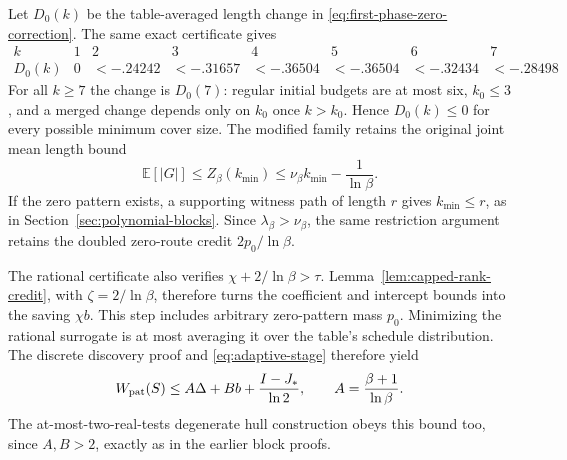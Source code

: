 Let $D_0(k)$ be the table-averaged length change in
\eqref{eq:first-phase-zero-correction}. The same exact certificate gives
\[
 \begin{array}{c|rrrrrrr}
 k&1&2&3&4&5&6&7\\\hline
 D_0(k)&0&<-.24242&<-.31657&<-.36504&<-.36504&<-.32434&<-.28498
 \end{array}
\]
For all $k\ge7$ the change is $D_0(7)$: regular initial budgets are
at most six, $k_0\le3$, and a merged change depends only on $k_0$
once $k>k_0$. Hence $D_0(k)\le0$ for every possible minimum cover
size. The modified family retains the original joint mean length bound
\[
 \mathbb E[|G|]\le Z_\beta(k_{\min})
 \le\nu_\beta k_{\min}-\frac1{\ln\beta}.
\]
If the zero pattern exists, a supporting witness path of length $r$
gives $k_{\min}\le r$, as in Section~\ref{sec:polynomial-blocks}.
Since $\lambda_\beta>\nu_\beta$, the same restriction argument
retains the doubled zero-route credit $2p_0/\ln\beta$.

The rational certificate also verifies $\chi+2/\ln\beta>\tau$.
Lemma~\ref{lem:capped-rank-credit}, with $\zeta=2/\ln\beta$,
therefore turns the coefficient and intercept bounds into the saving
$\chi b$. This step includes arbitrary zero-pattern mass $p_0$.
Minimizing the rational surrogate is at most averaging it over the
table's schedule distribution. The discrete discovery proof and
\eqref{eq:adaptive-stage} therefore yield
\begin{equation}\label{eq:first-phase-local}
 W_{\rm pat}(S)\le A\Delta+B b+\frac{I-J_*}{\ln2},
 \qquad A=\frac{\beta+1}{\ln\beta}.
\end{equation}
The at-most-two-real-tests degenerate hull construction obeys this
bound too, since $A,B>2$, exactly as in the earlier block proofs.

